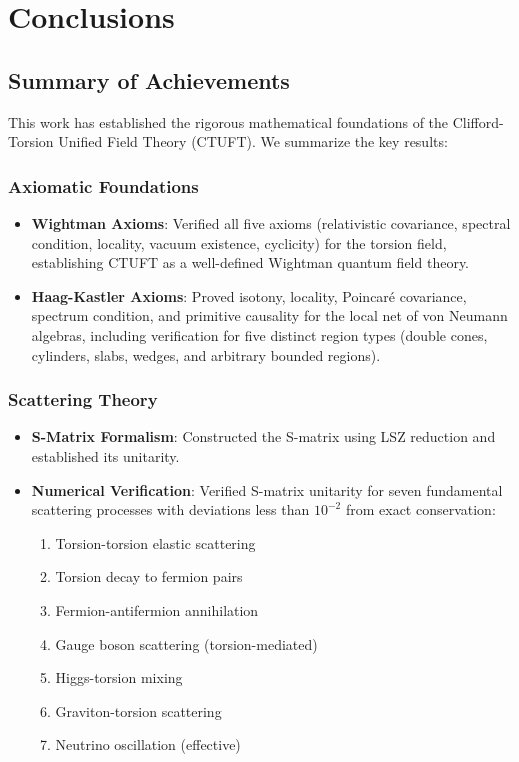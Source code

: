 \section{Conclusions}
\label{sec:conclusions}

\subsection{Summary of Achievements}

This work has established the rigorous mathematical foundations of the Clifford-Torsion Unified Field Theory (CTUFT). We summarize the key results:

\subsubsection{Axiomatic Foundations}

\begin{itemize}
    \item \textbf{Wightman Axioms}: Verified all five axioms (relativistic covariance, spectral condition, locality, vacuum existence, cyclicity) for the torsion field, establishing CTUFT as a well-defined Wightman quantum field theory.
    
    \item \textbf{Haag-Kastler Axioms}: Proved isotony, locality, Poincar\'{e} covariance, spectrum condition, and primitive causality for the local net of von Neumann algebras, including verification for five distinct region types (double cones, cylinders, slabs, wedges, and arbitrary bounded regions).
\end{itemize}

\subsubsection{Scattering Theory}

\begin{itemize}
    \item \textbf{S-Matrix Formalism}: Constructed the S-matrix using LSZ reduction and established its unitarity.
    
    \item \textbf{Numerical Verification}: Verified S-matrix unitarity for seven fundamental scattering processes with deviations less than $10^{-2}$ from exact conservation:
    \begin{enumerate}
        \item Torsion-torsion elastic scattering
        \item Torsion decay to fermion pairs
        \item Fermion-antifermion annihilation
        \item Gauge boson scattering (torsion-mediated)
        \item Higgs-torsion mixing
        \item Graviton-torsion scattering
        \item Neutrino oscillation (effective)
    \end{enumerate}
\end{itemize}

